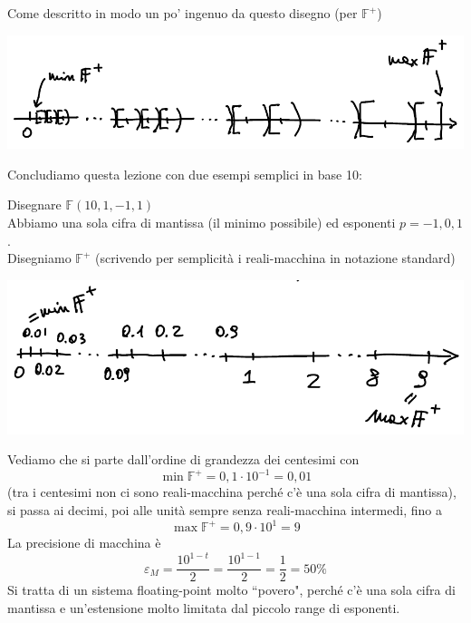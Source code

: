 Come descritto in modo un po' ingenuo da questo disegno (per $\mathbb{F}^+$) 
\begin{center}
    \includegraphics[scale=0.65]{foto/img9}
\end{center}
Concludiamo questa lezione con due esempi semplici in base 10:
\begin{esempio} \end{esempio}
Disegnare $\mathbb{F}(10, 1, -1, 1)$ \\
Abbiamo una sola cifra di mantissa (il minimo possibile) ed esponenti $p = -1, 0, 1$.\\
Disegniamo $\mathbb{F}^+$ (scrivendo per semplicità i reali-macchina in notazione standard) 
\begin{center}
    \includegraphics[scale=0.65]{foto/img10}
\end{center}
Vediamo che si parte dall'ordine di grandezza dei centesimi con 
\[ \min \mathbb{F}^+ = 0,1 \cdot 10^{-1} = 0,01 \]
(tra i centesimi non ci sono reali-macchina perché c'è una sola cifra di mantissa), si passa ai decimi, poi alle unità sempre senza reali-macchina intermedi, fino a
\[ \max \mathbb{F}^+ = 0,9 \cdot 10^1 = 9 \]
La precisione di macchina è 
\[ \varepsilon_M = \frac{10^{1-t}}{2} = \frac{10^{1-1}}{2} = \frac{1}{2} = 50\% \]
Si tratta di un sistema floating-point molto ``povero", perché c'è una sola cifra di mantissa e un'estensione molto limitata dal piccolo range di esponenti.

